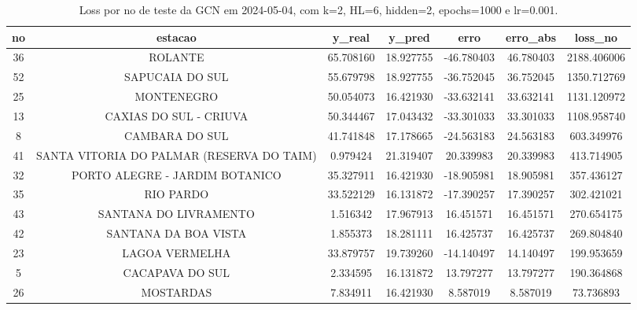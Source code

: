 \begin{table}[h]
\centering
\caption{Loss por no de teste da GCN em 2024-05-04, com k=2, HL=6, hidden=2, epochs=1000 e lr=0.001.}
\label{tab:gcn_loss_k2_hl6_h2_e1000_d20240504}
\begin{tabular}{ccccccc}
\toprule
no & estacao & y\_real & y\_pred & erro & erro\_abs & loss\_no \\
\midrule
36 & ROLANTE & 65.708160 & 18.927755 & -46.780403 & 46.780403 & 2188.406006 \\
52 & SAPUCAIA DO SUL & 55.679798 & 18.927755 & -36.752045 & 36.752045 & 1350.712769 \\
25 & MONTENEGRO & 50.054073 & 16.421930 & -33.632141 & 33.632141 & 1131.120972 \\
13 & CAXIAS DO SUL - CRIUVA & 50.344467 & 17.043432 & -33.301033 & 33.301033 & 1108.958740 \\
8 & CAMBARA DO SUL & 41.741848 & 17.178665 & -24.563183 & 24.563183 & 603.349976 \\
41 & SANTA VITORIA DO PALMAR (RESERVA DO TAIM) & 0.979424 & 21.319407 & 20.339983 & 20.339983 & 413.714905 \\
32 & PORTO ALEGRE - JARDIM BOTANICO & 35.327911 & 16.421930 & -18.905981 & 18.905981 & 357.436127 \\
35 & RIO PARDO & 33.522129 & 16.131872 & -17.390257 & 17.390257 & 302.421021 \\
43 & SANTANA DO LIVRAMENTO & 1.516342 & 17.967913 & 16.451571 & 16.451571 & 270.654175 \\
42 & SANTANA DA BOA VISTA & 1.855373 & 18.281111 & 16.425737 & 16.425737 & 269.804840 \\
23 & LAGOA VERMELHA & 33.879757 & 19.739260 & -14.140497 & 14.140497 & 199.953659 \\
5 & CACAPAVA DO SUL & 2.334595 & 16.131872 & 13.797277 & 13.797277 & 190.364868 \\
26 & MOSTARDAS & 7.834911 & 16.421930 & 8.587019 & 8.587019 & 73.736893 \\
\bottomrule
\end{tabular}
\end{table}
